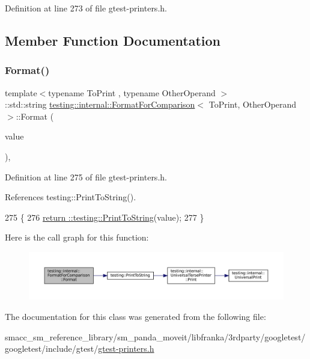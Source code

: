 Definition at line 273 of file gtest-\/printers.\+h.



\subsection{Member Function Documentation}
\mbox{\label{classtesting_1_1internal_1_1FormatForComparison_a2aeb688fc55b57abd3021d82eccad896}} 
\subsubsection{\texorpdfstring{Format()}{Format()}}
{\footnotesize\ttfamily template$<$typename To\+Print , typename Other\+Operand $>$ \\
\+::std\+::string \hyperlink{classtesting_1_1internal_1_1FormatForComparison}{testing\+::internal\+::\+Format\+For\+Comparison}$<$ To\+Print, Other\+Operand $>$\+::Format (\begin{DoxyParamCaption}\item[{const To\+Print \&}]{value }\end{DoxyParamCaption})\hspace{0.3cm}{\ttfamily [inline]}, {\ttfamily [static]}}



Definition at line 275 of file gtest-\/printers.\+h.



References testing\+::\+Print\+To\+String().


\begin{DoxyCode}
275                                                 \{
276     \hyperlink{namespacetesting_aa5717bb1144edd1d262d310ba70c82ed}{return ::testing::PrintToString}(value);
277   \}
\end{DoxyCode}
Here is the call graph for this function\+:
\nopagebreak
\begin{figure}[H]
\begin{center}
\leavevmode
\includegraphics[width=350pt]{classtesting_1_1internal_1_1FormatForComparison_a2aeb688fc55b57abd3021d82eccad896_cgraph}
\end{center}
\end{figure}


The documentation for this class was generated from the following file\+:\begin{DoxyCompactItemize}
\item 
smacc\+\_\+sm\+\_\+reference\+\_\+library/sm\+\_\+panda\+\_\+moveit/libfranka/3rdparty/googletest/googletest/include/gtest/\hyperlink{gtest-printers_8h}{gtest-\/printers.\+h}\end{DoxyCompactItemize}

